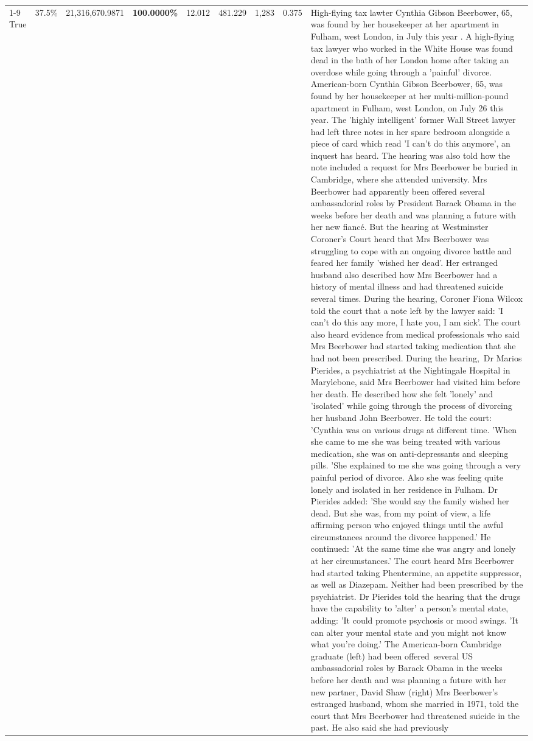 \begin{table}[H]
\begin{tabular}{lllrlllll}
\cline{1-9}
True & 37.5\% & 21,316,670.9871 & \bfseries \color{red} 100.0000\% & 12.012 & 481.229 & 1,283 & 0.375 & High-flying tax lawter Cynthia Gibson Beerbower, 65, was found by her housekeeper at her apartment in Fulham, west London, in July this year . A high-flying tax lawyer who worked in the White House was found dead in the bath of her London home after taking an overdose while going through a 'painful' divorce. American-born Cynthia Gibson Beerbower, 65, was found by her housekeeper at her multi-million-pound apartment in Fulham, west London, on July 26 this year. The 'highly intelligent' former Wall Street lawyer had left three notes in her spare bedroom alongside a piece of card which read 'I can't do this anymore', an inquest has heard. The hearing was also told how the note included a request for Mrs Beerbower be buried in Cambridge, where she attended university. Mrs Beerbower had apparently been offered several ambassadorial roles by President Barack Obama in the weeks before her death and was planning a future with her new fiancé. But the hearing at Westminster Coroner's Court heard that Mrs Beerbower was struggling to cope with an ongoing divorce battle and feared her family 'wished her dead'. Her estranged husband also described how Mrs Beerbower had a history of mental illness and had threatened suicide several times. During the hearing, Coroner Fiona Wilcox told the court that a note left by the lawyer said: 'I can't do this any more, I hate you, I am sick'. The court also heard evidence from medical professionals who said Mrs Beerbower had started taking medication that she had not been prescribed. During the hearing, Dr Marios Pierides, a psychiatrist at the Nightingale Hospital in Marylebone, said Mrs Beerbower had visited him before her death. He described how she felt 'lonely' and 'isolated' while going through the process of divorcing her husband John Beerbower. He told the court: 'Cynthia was on various drugs at different time. 'When she came to me she was being treated with various medication, she was on anti-depressants and sleeping pills. 'She explained to me she was going through a very painful period of divorce. Also she was feeling quite lonely and isolated in her residence in Fulham. Dr Pierides added: 'She would say the family wished her dead. But she was, from my point of view, a life affirming person who enjoyed things until the awful circumstances around the divorce happened.' He continued: 'At the same time she was angry and lonely at her circumstances.' The court heard Mrs Beerbower had started taking Phentermine, an appetite suppressor, as well as Diazepam. Neither had been prescribed by the psychiatrist. Dr Pierides told the hearing that the drugs have the capability to 'alter' a person's mental state, adding: 'It could promote psychosis or mood swings. 'It can alter your mental state and you might not know what you're doing.' The American-born Cambridge graduate (left) had been offered several US ambassadorial roles by Barack Obama in the weeks before her death and was planning a future with her new partner, David Shaw (right) Mrs Beerbower's estranged husband, whom she married in 1971, told the court that Mrs Beerbower had threatened suicide in the past. He also said she had previously 
\end{tabular}
\end{table}
